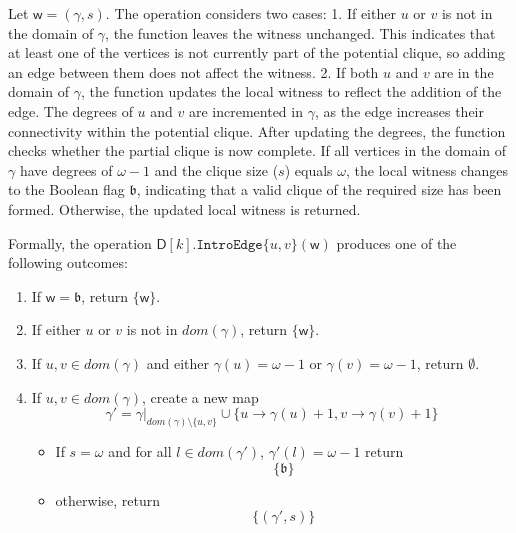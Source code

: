 \documentclass[11pt,a4paper]{article}
\newcommand{\treewidthvalue}{k}
\newcommand{\introedgegeneric}[2]{\mathtt{IntroEdge}\{#1,#2\}}
\newcommand{\vertexone}{u}
\newcommand{\vertextwo}{v}
\newcommand{\awitness}{\mathsf{w}}
\newcommand{\dpcore}{\mathsf{D}}
\newcommand{\domain}{dom}
\newcommand{\cliqueparameter}{\omega}
\newcommand{\cliquemap}{\gamma}
\newcommand{\cliquesize}{s}
\newcommand{\cliquefound}{\mathfrak{b}}
\begin{document}
{	Let \(\awitness = (\cliquemap,\cliquesize)\). The operation considers two cases:
	1. If either \(\vertexone\) or \(\vertextwo\) is not in the domain of \(\cliquemap\), the function leaves the witness unchanged. This indicates that at least one of the vertices is not currently part of the potential clique, so adding an edge between them does not affect the witness.
	2. If both \(\vertexone\) and \(\vertextwo\) are in the domain of \(\cliquemap\), the function updates the local witness to reflect the addition of the edge. The degrees of \(\vertexone\) and \(\vertextwo\) are incremented in \(\cliquemap\), as the edge increases their connectivity within the potential clique. After updating the degrees, the function checks whether the partial clique is now complete. If all vertices in the domain of \(\cliquemap\) have degrees of \(\cliqueparameter - 1\) and the clique size (\(\cliquesize\)) equals \(\cliqueparameter\), the local witness changes to the Boolean flag \(\cliquefound\), indicating that a valid clique of the required size has been formed. Otherwise, the updated local witness is returned.

	Formally, the operation $\dpcore[\treewidthvalue].\introedgegeneric{\vertexone}{\vertextwo}(\awitness)$ produces one of the following outcomes:

		\begin{enumerate}
		\item If $\awitness=\cliquefound$, return $\{\awitness\}$.
		\item If either $\vertexone$ or $\vertextwo$ is not in $\domain(\cliquemap)$, return $\{\awitness\}$.
		\item If $\vertexone,\vertextwo\in \domain(\cliquemap)$ and either $\cliquemap(\vertexone)=\cliqueparameter-1$ or $\cliquemap(\vertextwo)=\cliqueparameter-1$, return $\emptyset$.
		\item If $\vertexone,\vertextwo\in \domain(\cliquemap)$, create a new map
	\[
	\cliquemap' = \cliquemap|_{\domain(\cliquemap)\setminus \{\vertexone,\vertextwo\}}\cup\{\vertexone\to\cliquemap(\vertexone)+1,\vertextwo\to\cliquemap(\vertextwo)+1\}
	\]
	\begin{itemize}
		\item If $\cliquesize=\cliqueparameter$ and for all $l \in \domain(\cliquemap')$, $\cliquemap'(l) = \cliqueparameter-1$ return
		\[ \{\cliquefound\}\]
		\item otherwise, return
		\[\{ (\cliquemap',\cliquesize)\}\]
		\end{itemize}
		\end{enumerate}

}
\end{document}
